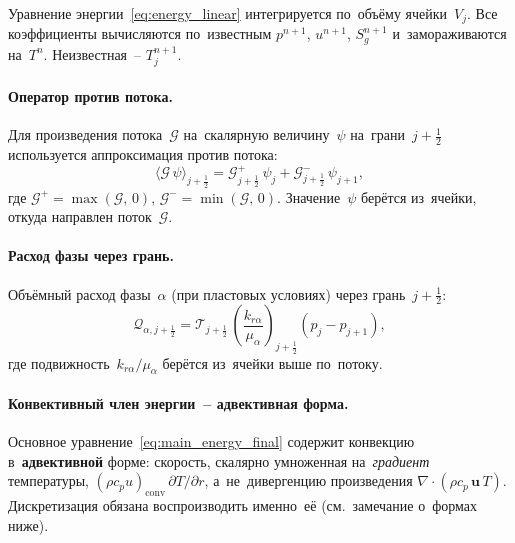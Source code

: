 \documentclass[12pt,a4paper]{article}
\newcommand{\half}{\tfrac{1}{2}}
\newcommand{\rhocpconv}{(\rho c_p u)_{\mathrm{conv}}}
\begin{document}
Уравнение энергии~\eqref{eq:energy_linear} интегрируется
по~объёму ячейки~$V_j$. Все коэффициенты вычисляются
по~известным $p^{n+1}$, $u^{n+1}$, $S_g^{n+1}$ и~замораживаются
на~$T^n$. Неизвестная~-- $T_j^{n+1}$.

\paragraph{Оператор против потока.}
Для произведения потока~$\mathcal{G}$ на~скалярную величину~$\psi$
на~грани~$j+\half$ используется аппроксимация против потока:
\begin{equation}\label{eq:upstream_operator}
  \langle\mathcal{G}\,\psi\rangle_{j+\half}
  = \mathcal{G}_{j+\half}^+\,\psi_j
  + \mathcal{G}_{j+\half}^-\,\psi_{j+1},
\end{equation}
где $\mathcal{G}^+ = \max(\mathcal{G},\,0)$,
$\mathcal{G}^- = \min(\mathcal{G},\,0)$.
Значение~$\psi$ берётся из~ячейки, откуда направлен
поток~$\mathcal{G}$.

\paragraph{Расход фазы через грань.}
Объёмный расход фазы~$\alpha$ (при пластовых условиях) через
грань~$j+\half$:
\begin{equation}\label{eq:phase_flux}
  \mathcal{Q}_{\alpha,j+\half}
  = \mathcal{T}_{j+\half}\,
    \left(\frac{k_{r\alpha}}{\mu_\alpha}\right)_{\!j+\half}
    \!(p_j - p_{j+1}),
\end{equation}
где подвижность~$k_{r\alpha}/\mu_\alpha$ берётся из~ячейки
выше по~потоку.

\paragraph{Конвективный член энергии~-- адвективная форма.}
Основное уравнение~\eqref{eq:main_energy_final} содержит конвекцию
в~\textbf{адвективной} форме: скорость, скалярно умноженная
на~\emph{градиент} температуры, $\rhocpconv\,\partial T/\partial r$,
а~не~дивергенцию произведения $\nabla\!\cdot\!(\rho c_p\,\mathbf{u}\,T)$.
Дискретизация обязана воспроизводить именно~её (см.~замечание
о~формах ниже).
\end{document}

